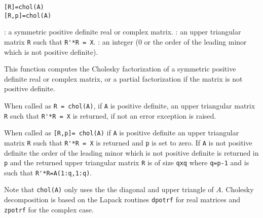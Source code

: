 
\begin{mandesc}
\end{mandesc}

\begin{calling_sequence}
\begin{verbatim}
[R]=chol(A)
[R,p]=chol(A)
\end{verbatim}
\end{calling_sequence}
\begin{parameters}
  \begin{varlist}
     : a symmetric positive definite real or complex matrix. 
     : an upper triangular matrix \verb+R+ such that \verb+R'*R = X+.
     : an integer (0 or the order of the leading minor which is 
not positive definite).
  \end{varlist}
\end{parameters}

\begin{mandescription}
This function computes the Cholesky factorization of a symmetric positive 
definite real or complex matrix, or a partial factorization if the matrix is not 
positive definite.

When called as \verb+R = chol(A)+, if \verb+A+ is positive definite, an upper triangular 
matrix \verb+R+ such that \verb+R'*R = X+ is returned, if not an error exception is 
raised.

When called as \verb+[R,p]= chol(A)+ if \verb+A+ is positive definite an upper triangular 
matrix \verb+R+ such that \verb+R'*R = X+ is returned and \verb+p+ is set to zero. 
If \verb+A+ is not positive definite the order of the leading minor which is 
not positive definite is returned in \verb+p+ and the returned upper triangular matrix \verb+R+ is 
of size \verb+qxq+ where \verb+q=p-1+ and is such that \verb+R'*R=A(1:q,1:q)+.

Note that \verb+chol(A)+ only uses the the diagonal and upper triangle of $A$. 
Cholesky decomposition is based on the Lapack routines \verb+dpotrf+ for real 
matrices and \verb+zpotrf+ for the complex case.
\end{mandescription}

